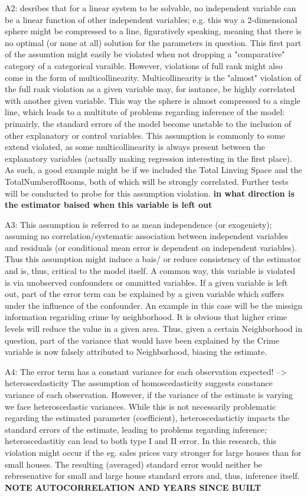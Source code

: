 \documentclass{article}
\begin{document}
A2: desribes that for a linear system to be solvable, no independent variable can be a linear function of other independent variables; e.g. this way a 2-dimensional sphere might be compressed to a line, figuratively speaking, meaning that there is no optimal (or none at all) solution for the parameters in question. This first part of the assumtion might easily be violated when not dropping a "comparative" category of a categorical varaible. However, violations of full rank might also come in the form of multicollinearity. Multicollinearity is the "almost" violation of the full rank violation as a given variable may, for isntance, be highly correlated with another given variable. This way the sphere is almost compressed to a single line, which leads to a multitute of problems regarding inference of the model: primairly, the standard errors of the model become unstable to the inclusion of other explanatory or control variables. This assumption is commonly to some extend violated, as some multicollinearity is always present between the explanatory variables (actually making regression interesting in the first place). As such, a good example might be if we included the Total Linving Space and the TotalNumberofRooms, both of which will be strongly correlated. Further tests will be conducted to probe for this assumption violation. 
\textbf{in what direction is the estimator baised when this variable is left out}

A3: This assumption is referred to as mean independence (or exogeniety); assuming no correlation/systematic association between independent variables and residuals (or conditional mean error is dependent on independent variables). Thus this assumption might induce a bais/ or reduce consistency of the estimator and is, thus, critical to the model itself. A common way, this variable is violated is via unobserved confounders or ommitted variables. If a given variable is left out, part of the error term can be explained by a given variable which suffers under the influence of the confounder. An example in this case will be the missign information regariding crime by neighborhood. It is obvious that higher crime levels will reduce the value in a given area. Thus, given a certain Neighborhood in question, part of the variance that would have been explained by the Crime variable is now falsely attributed to Neighborhood, biasing the estimate.

A4: The error term has a constant variance for each observation expected! --> heteroscedasticity
The assumption of homoscedasticity suggests constance variance of each observation. However, if the variance of the estimate is varying we face heteroscedastic variances. While this is not necessarily problematic regarding the estimated parameter (coefficient), heteroscedastictiy impacts the standard errors of the estimate, leading to problems regarding inference; heteroscedastitiy can lead to both type I and II error. In this research, this violation might occur if the eg. sales prices vary stronger for large houses than for small houses. The resulting (averaged) standard error would neither be rebresenative for small and large house standard errors and, thus, inference itself.
\textbf{NOTE AUTOCORRELATION AND YEARS SINCE BUILT}
\end{document}
